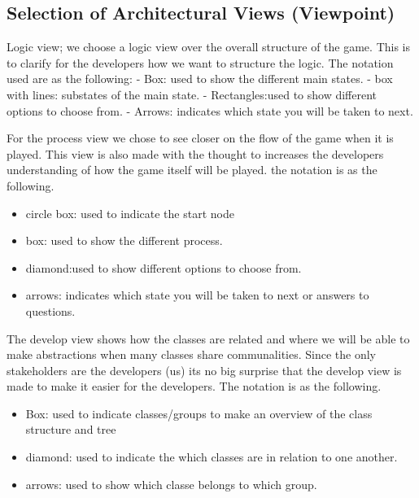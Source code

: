 \subsection{Selection of Architectural Views (Viewpoint)}

Logic view; we choose a logic view over the overall structure of the game. This is to clarify for the developers how we want to structure the logic. The notation used are as the following:
- Box: used to show the different main states.
- box with lines: substates of the main state.
- Rectangles:used to show different options to choose from. 
- Arrows: indicates which state you will be taken to next.

For the process view we chose to see closer on the flow of the game when it is played. This view is also made with the thought to increases the developers understanding of how the game itself will be played. the notation is as the following.\\

\begin{itemize}
	\item circle box: used to indicate the start node
	\item  box: used to show the different process.
	\item diamond:used to show different options to choose from. 
	\item arrows: indicates which state you will be taken to next or answers to questions.
\end{itemize}


The develop view shows how the classes are related and where we will be able to make abstractions when many classes share communalities. Since the only stakeholders are the developers (us) its no big surprise that the develop view is made to make it easier for the developers. The notation is as the following. \\

\begin{itemize}
	\item Box: used to indicate classes/groups to make an overview of the class structure and tree
	\item diamond: used to indicate the which classes are in relation to one another.
	\item arrows: used to show which classe belongs to which group.
\end{itemize}
